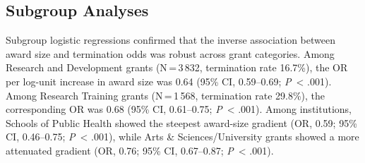 \documentclass[10pt, letterpaper]{article}
\begin{document}
\subsection*{Subgroup Analyses}

Subgroup logistic regressions confirmed that the inverse association between award size and termination odds was robust across grant categories. Among Research and Development grants (N\,=\,3\,832, termination rate 16.7\%), the OR per log-unit increase in award size was 0.64 (95\% CI, 0.59--0.69; \textit{P}~< .001). Among Research Training grants (N\,=\,1\,568, termination rate 29.8\%), the corresponding OR was 0.68 (95\% CI, 0.61--0.75; \textit{P}~< .001). Among institutions, Schools of Public Health showed the steepest award-size gradient (OR, 0.59; 95\% CI, 0.46--0.75; \textit{P}~< .001), while Arts \& Sciences/University grants showed a more attenuated gradient (OR, 0.76; 95\% CI, 0.67--0.87; \textit{P}~< .001).

\vspace{6pt}
\end{document}
